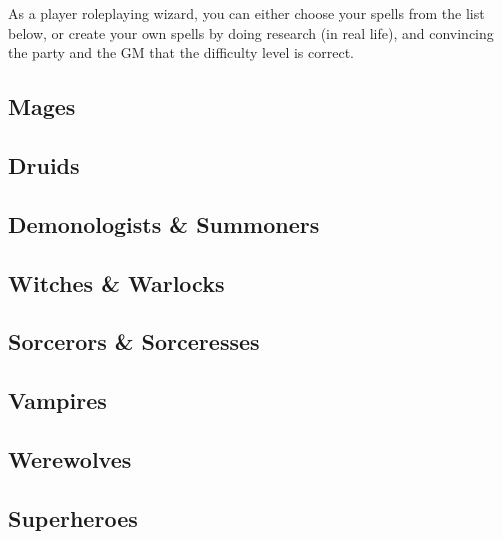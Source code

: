 \documentclass{LegrandOrangeTufteBook}
\newcommand{\termClass}[1]{\textcolor{xkcdBlueGreen}{#1}}
\begin{document}
As a player roleplaying \termClass{wizard}, you can either choose your spells from the list below,
or create your own spells by doing research (in real life), and convincing the party and the GM
that the difficulty level is correct.

\subsection*{Mages}

\subsection*{Druids}

\subsection*{Demonologists \& Summoners}

\subsection*{Witches \& Warlocks}

\subsection*{Sorcerors \& Sorceresses}

\subsection*{Vampires}

\subsection*{Werewolves}

\subsection*{Superheroes}
\end{document}

